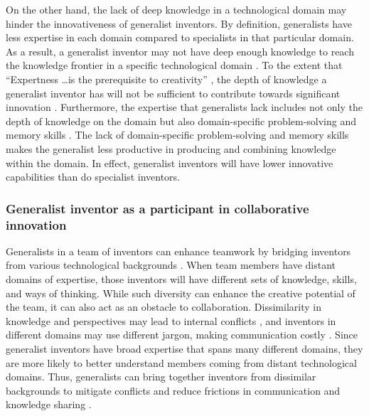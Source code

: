 \documentclass{article}
\begin{document}
On the other hand, the lack of deep knowledge in a technological domain may hinder the innovativeness of generalist inventors. By definition, generalists have less expertise in each domain compared to specialists in that particular domain. As a result, a generalist inventor may not have deep enough knowledge to reach the knowledge frontier in a specific technological domain \autocite{Jones2009}. To the extent that ``Expertness \dots is the prerequisite to creativity'' \autocite{Simon1985}, the depth of knowledge a generalist inventor has will not be sufficient to contribute towards significant innovation \autocite{Boh2014,Dane2010,Conti2014}.
Furthermore, the expertise that generalists lack includes not only the depth of knowledge on the domain but also domain-specific problem-solving and memory skills \autocite{Larkin1980,Sweller1983}. The lack of domain-specific problem-solving and memory skills makes the generalist less productive in producing and combining knowledge within the domain. In effect, generalist inventors will have lower innovative capabilities than do specialist inventors.

\subsubsection{Generalist inventor as a participant in collaborative innovation}
Generalists in a team of inventors can enhance teamwork by bridging inventors from various technological backgrounds \autocite{Melero2015}. When team members have distant domains of expertise, those inventors will have different sets of knowledge, skills, and ways of thinking. While such diversity can enhance the creative potential of the team, it can also act as an obstacle to collaboration. Dissimilarity in knowledge and perspectives may lead to internal conflicts \autocite{Huo2019}, and inventors in different domains may use different jargon, making communication costly \autocite{Giuri2010,Laursen2005}.
Since generalist inventors have broad expertise that spans many different domains, they are more likely to better understand members coming from distant technological domains. Thus, generalists can bring together inventors from dissimilar backgrounds to mitigate conflicts and reduce frictions in communication and knowledge sharing \autocite{Rulke2000}.
\end{document}
